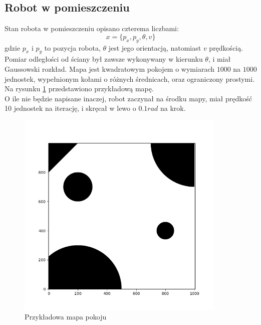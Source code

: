 \subsection{Robot w pomieszczeniu} \label{robot_w_pomieszczeniu_desc}
Stan robota w pomieszczeniu opisano czterema liczbami:
\begin{equation*}
	x = \{p_x,p_y,\theta,v\}
\end{equation*}
gdzie $p_x$ i $p_y$ to pozycja robota, $\theta$ jest jego orientacją, natomiast $v$ prędkością. Pomiar odległości od ściany był zawsze wykonywany w kierunku $\theta$, i miał Gaussowski rozkład. Mapa jest kwadratowym pokojem o wymiarach $1000$ na $1000$ jednostek, wypełnionym kołami o różnych średnicach, oraz ograniczony prostymi. Na rysunku \ref{przykladowa_mapa_pokoju} przedstawiono przykładową mapę.\\
O ile nie będzie napisane inaczej, robot zaczynał na środku mapy, miał prędkość 10 jednostek na iterację, i skręcał w lewo o $0.1rad$ na krok.
\begin{figure}[H]
	\begin{center}
		\includegraphics[width=10cm]{./przykladowa_mapa_pokoju.png}
		\caption{Przykładowa mapa pokoju}
		\label{przykladowa_mapa_pokoju}
	\end{center}
\end{figure}
